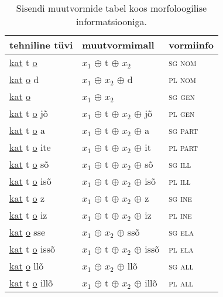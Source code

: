 \documentclass[12pt,a4paper]{article}
\begin{document}
\begin{table}[H]
\begin{minipage}[t]{.40\textwidth}
    \caption{Sisendi muutvormide tabel koos morfo\-loogilise informatsiooniga.}
    \label{tab:sisendtabel-katto}
  \end{minipage}
  \hfill
  \begin{minipage}[t]{.55\textwidth}
    \centering
    \begin{tabular}[t]{l l l}
      tehniline tüvi                     & muutvormi\-mall           & vormiinfo \\
      \hline
      \underline{kat} t \underline{o}       & $x_1$ $\oplus$ t $\oplus$ $x_2$         & \textsc{sg nom} \\
      \underline{kat}   \underline{o} d     & $x_1$ $\oplus$ $x_2$ $\oplus$ d         & \textsc{pl nom} \\
      \underline{kat}   \underline{o}       & $x_1$ $\oplus$ $x_2$             & \textsc{sg gen} \\
      \underline{kat} t \underline{o} jõ    & $x_1$ $\oplus$ t $\oplus$ $x_2$ $\oplus$ jõ    & \textsc{pl gen} \\
      \underline{kat} t \underline{o} a     & $x_1$ $\oplus$ t $\oplus$ $x_2$ $\oplus$ a     & \textsc{sg part} \\
      \underline{kat} t \underline{o} ite   & $x_1$ $\oplus$ t $\oplus$ $x_2$ $\oplus$ it    & \textsc{pl part} \\
      \underline{kat} t \underline{o} sõ    & $x_1$ $\oplus$ t $\oplus$ $x_2$ $\oplus$ sõ    & \textsc{sg ill} \\
      \underline{kat} t \underline{o} isõ   & $x_1$ $\oplus$ t $\oplus$ $x_2$ $\oplus$ isõ   & \textsc{pl ill} \\
      \underline{kat} t \underline{o} z     & $x_1$ $\oplus$ t $\oplus$ $x_2$ $\oplus$ z     & \textsc{sg ine} \\
      \underline{kat} t \underline{o} iz    & $x_1$ $\oplus$ t $\oplus$ $x_2$ $\oplus$ iz    & \textsc{pl ine} \\
      \underline{kat}   \underline{o} sse   & $x_1$ $\oplus$ $x_2$ $\oplus$ ssõ       & \textsc{sg ela} \\
      \underline{kat} t \underline{o} issõ  & $x_1$ $\oplus$ t $\oplus$ $x_2$ $\oplus$ issõ  & \textsc{pl ela} \\
      \underline{kat}   \underline{o} llõ   & $x_1$ $\oplus$ $x_2$ $\oplus$ llõ       & \textsc{sg all} \\
      \underline{kat} t \underline{o} illõ  & $x_1$ $\oplus$ t $\oplus$ $x_2$ $\oplus$ illõ  & \textsc{pl all} \\

\end{tabular}
\end{minipage}
\end{table}
\end{document}
